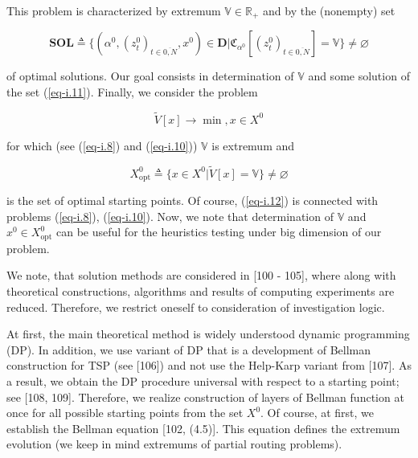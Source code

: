 \documentclass{article}
\begin{document}
This problem is characterized by extremum
$\mathbb V \in \mathbb R_+$
and by the (nonempty) set

\begin{equation}
  \label{eq-i.11}
  \mathbf{SOL}
  \triangleq
  \{
    (\alpha^0, (z_t^0)_{t \in \overline{0,N}}, x^0) \in \mathbf D
  |
    \mathfrak C_{\alpha^0}[(z_t^0)_{t \in \overline{0,N}}] = \mathbb V
  \}
  \neq \varnothing
\end{equation}

of optimal solutions.
Our goal consists in determination of
$\mathbb V$
and some solution of the set (\ref{eq-i.11}).
Finally, we consider the problem

\begin{equation}
  \label{eq-i.12}
  \tilde{V}[x] \to \min,
  x \in X^0
\end{equation}

for which
(see (\ref{eq-i.8}) and (\ref{eq-i.10}))
$\mathbb V$
is extremum and

\begin{equation*}
  X^0_{\mathrm{opt}}
  \triangleq
  \{
    x \in X^0
  |
    \tilde{V}[x] = \mathbb V
  \}
  \neq \varnothing
\end{equation*}

is the set of optimal starting points.
Of course,
(\ref{eq-i.12})
is connected with problems
(\ref{eq-i.8}), (\ref{eq-i.10}).
Now, we note that determination of
$\mathbb V$
and
$x^0 \in X^0_{\mathrm{opt}}$
can be useful for the heuristics testing
under big dimension of our problem.

We note, that solution methods are considered in
[100 - 105],       %
where along with theoretical constructions,
algorithms and results of computing experiments are reduced.
Therefore,
we restrict oneself to consideration of investigation logic.

At first,
the main theoretical method is widely understood dynamic programming
(DP).
In addition,
we use variant of DP that is a development of Bellman
construction for TSP
(see [106])   %
and not use the Help-Karp variant from
[107].        %
As a result,
we obtain the DP procedure universal with respect to
a starting point; see
[108, 109].   %
Therefore,
we realize construction of layers of Bellman function at once
for all possible starting points from the set
$X^0$.
Of course,
at first,
we establish the Bellman equation
[102, (4.5)].  %
This equation defines the extremum evolution
(we keep in mind extremums of partial routing problems).
\end{document}
